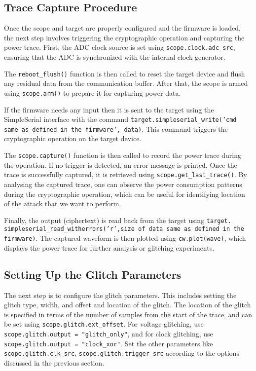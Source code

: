 \subsection{Trace Capture Procedure}
Once the scope and target are properly configured and the firmware is loaded, the next step involves triggering the cryptographic operation and capturing the power trace. First, the ADC clock source is set using \texttt{scope.clock.adc\_src}, ensuring that the ADC is synchronized with the internal clock generator.

The \texttt{reboot\_flush()} function is then called to reset the target device and flush any residual data from the communication buffer. After that, the scope is armed using \texttt{scope.arm()} to prepare it for capturing power data.

If the firmware needs any input then it is sent to the target using the SimpleSerial interface with the command \texttt{target.simpleserial\_write('{cmd same as defined in the firmware}', data)}. This command triggers the cryptographic operation on the target device.

The \texttt{scope.capture()} function is then called to record the power trace during the operation. If no trigger is detected, an error message is printed. Once the trace is successfully captured, it is retrieved using \texttt{scope.get\_last\_trace()}. By analysing the captured trace, one can observe the power consumption patterns during the cryptographic operation, which can be useful for identifying location of the attack that we want to perform.

Finally, the output (ciphertext) is read back from the target using \texttt{target.\\simpleserial\_read\_witherrors('r',{size of data same as defined in the firmware})}. The captured waveform is then plotted using \texttt{cw.plot(wave)}, which displays the power trace for further analysis or glitching experiments.


\subsection{Setting Up the Glitch Parameters}
The next step is to configure the glitch parameters. This includes setting the glitch type, width, and offset and location of the glitch. The location of the glitch is specified in terms of the number of samples from the start of the trace, and can be set using \texttt{scope.glitch.ext\_offset}.
For voltage glitching, use \texttt{scope.glitch.output = "glitch\_only"}, and for clock glitching, use \texttt{scope.glitch.output = "clock\_xor"}. Set the other parameters like \texttt{scope.glitch.clk\_src}, \texttt{scope.glitch.trigger\_src} according to the options discussed in the previous section. 

